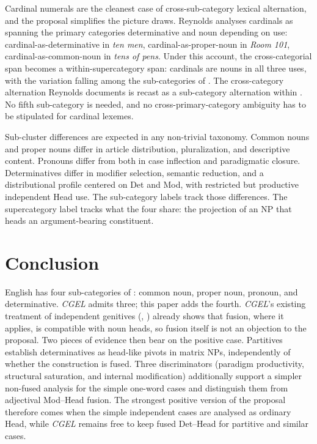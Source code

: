 \documentclass[12pt]{article}
\begin{document}
Cardinal numerals are the cleanest case of cross-sub-category lexical alternation, and the proposal simplifies the picture \citet{reynolds2026numerals} draws. Reynolds analyses cardinals as spanning the primary categories determinative and noun depending on use: cardinal-as-determinative in \textit{ten men}, cardinal-as-proper-noun in \textit{Room 101}, cardinal-as-common-noun in \textit{tens of pens}. Under this account, the cross-categorial span becomes a within-supercategory span: cardinals are nouns in all three uses, with the variation falling among the sub-categories of . The cross-category alternation Reynolds documents is recast as a sub-category alternation within . No fifth sub-category is needed, and no cross-primary-category ambiguity has to be stipulated for cardinal lexemes.

Sub-cluster differences are expected in any non-trivial taxonomy. Common nouns and proper nouns differ in article distribution, pluralization, and descriptive content. Pronouns differ from both in case inflection and paradigmatic closure. Determinatives differ in modifier selection, semantic reduction, and a distributional profile centered on Det and Mod, with restricted but productive independent Head use. The sub-category labels track those differences. The supercategory label tracks what the four share: the projection of an NP that heads an argument-bearing constituent.

\section{Conclusion}\label{sec:conclusion}

English has four sub-categories of : common noun, proper noun, pronoun, and determinative. \textit{CGEL} admits three; this paper adds the fourth. \textit{CGEL}'s existing treatment of independent genitives (, ) already shows that fusion, where it applies, is compatible with noun heads, so fusion itself is not an objection to the proposal. Two pieces of evidence then bear on the positive case. Partitives establish determinatives as head-like pivots in matrix NPs, independently of whether the construction is fused. Three discriminators (paradigm productivity, structural saturation, and internal modification) additionally support a simpler non-fused analysis for the simple one-word cases and distinguish them from adjectival Mod--Head fusion. The strongest positive version of the proposal therefore comes when the simple independent cases are analysed as ordinary Head, while \textit{CGEL} remains free to keep fused Det--Head for partitive and similar cases.
\end{document}
